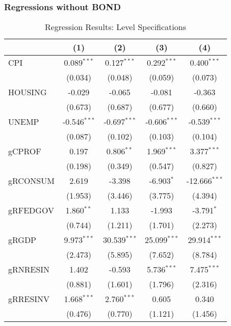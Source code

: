 \subsubsection{Regressions without BOND}
\begin{table}[H]
\centering
\caption{Regression Results: Level Specifications}
\begin{tabular}{@{\extracolsep{5pt}}lcccc}
\hline
\hline
& (1) & (2) & (3) & (4) \\
\hline
CPI & 0.089$^{***}$ & 0.127$^{***}$ & 0.292$^{***}$ & 0.400$^{***}$ \\
         & (0.034) & (0.048) & (0.059) & (0.073) \\

HOUSING & -0.029 & -0.065 & -0.081 & -0.363 \\
             & (0.673) & (0.687) & (0.677) & (0.660) \\

UNEMP & -0.546$^{***}$ & -0.697$^{***}$ & -0.606$^{***}$ & -0.539$^{***}$ \\
           & (0.087) & (0.102) & (0.103) & (0.104) \\

gCPROF & 0.197 & 0.806$^{**}$ & 1.969$^{***}$ & 3.377$^{***}$ \\
            & (0.198) & (0.349) & (0.547) & (0.827) \\

gRCONSUM & 2.619 & -3.398 & -6.903$^{*}$ & -12.666$^{***}$ \\
              & (1.953) & (3.446) & (3.775) & (4.394) \\

gRFEDGOV & 1.860$^{**}$ & 1.133 & -1.993 & -3.791$^{*}$ \\
              & (0.744) & (1.211) & (1.701) & (2.273) \\

gRGDP & 9.973$^{***}$ & 30.539$^{***}$ & 25.099$^{***}$ & 29.914$^{***}$ \\
           & (2.473) & (5.895) & (7.652) & (8.784) \\

gRNRESIN & 1.402 & -0.593 & 5.736$^{***}$ & 7.475$^{***}$ \\
              & (0.881) & (1.601) & (1.796) & (2.316) \\

gRRESINV & 1.668$^{***}$ & 2.760$^{***}$ & 0.605 & 0.340 \\
              & (0.476) & (0.770) & (1.121) & (1.456) \\


\end{tabular}
\end{table}
